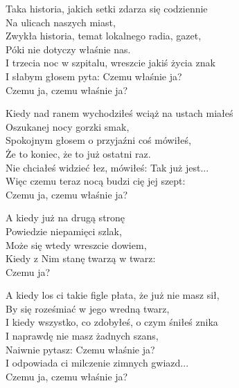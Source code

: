 \begin{text}
Taka historia, jakich setki zdarza się codziennie\\
Na ulicach naszych miast,\\
Zwykła historia, temat lokalnego radia, gazet,\\
Póki nie dotyczy właśnie nas.\\
I trzecia noc w szpitalu, wreszcie jakiś życia znak\\
I słabym głosem pyta: Czemu właśnie ja?\\
Czemu ja, czemu właśnie ja?

Kiedy nad ranem wychodziłeś wciąż na ustach miałeś\\
Oszukanej nocy gorzki smak,\\
Spokojnym głosem o przyjaźni coś mówiłeś,\\
Że to koniec, że to już ostatni raz.\\
Nie chciałeś widzieć łez, mówiłeś: Tak już jest...\\
Więc czemu teraz nocą budzi cię jej szept:\\
Czemu ja, czemu właśnie ja?

A kiedy już na drugą stronę\\
Powiedzie niepamięci szlak,\\
Może się wtedy wreszcie dowiem,\\
Kiedy z Nim stanę twarzą w twarz:\\
Czemu ja?

A kiedy los ci takie figle płata, że już nie masz sił,\\
By się roześmiać w jego wredną twarz,\\
I kiedy wszystko, co zdobyłeś, o czym śniłeś znika\\
I naprawdę nie masz żadnych szans,\\
Naiwnie pytasz: Czemu właśnie ja?\\
I odpowiada ci milczenie zimnych gwiazd...\\
Czemu ja, czemu właśnie ja?
\end{text}
